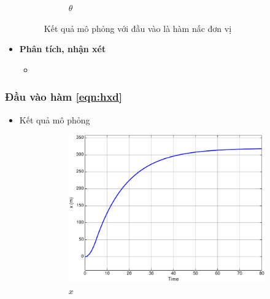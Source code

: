 \documentclass[12pt,a4paper]{article}
\begin{document}
\begin{itemize}
\begin{figure}[ht]
\begin{subfigure}[b]{0.495\linewidth}
            \caption{$\theta$}
        \end{subfigure}
        \caption{Kết quả mô phỏng với đầu vào là hàm nấc đơn vị}
    \end{figure}
    \item \textbf{Phân tích, nhận xét}
    \begin{itemize}
        \item 
    \end{itemize}
\end{itemize}


\subsubsection{Đầu vào hàm \eqref{eqn:hxd}}
\begin{itemize}
    \item Kết quả mô phỏng 
    \begin{figure}[ht]
        \centering
        \begin{subfigure}[b]{0.495\linewidth}
            \centering
            \includegraphics[width=\linewidth]{phan_tich_x_f.pdf}
            \caption{$x$}
        \end{subfigure}\hfill
        \begin{subfigure}[b]{0.495\linewidth}
            \centering

\end{subfigure}
\end{figure}
\end{itemize}
\end{document}
